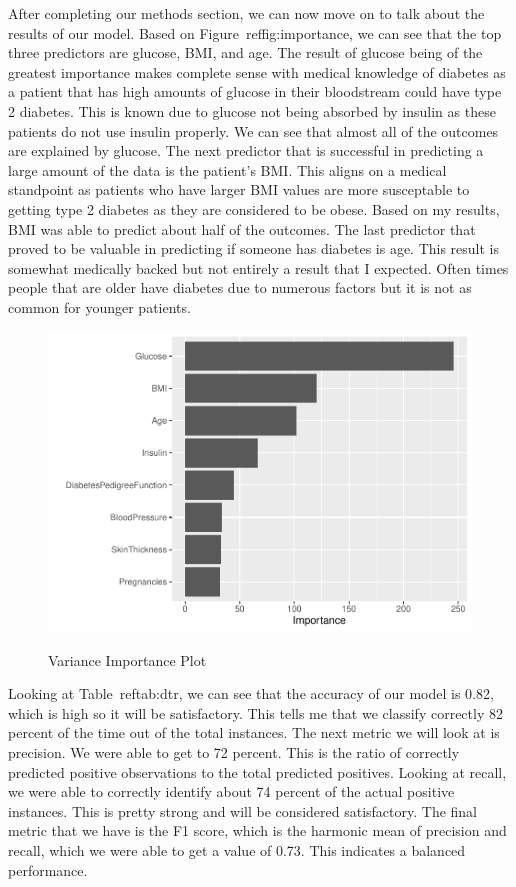 \documentclass[12pt]{article}
\begin{document}
After completing our methods section, we can now move on to talk about the results of our model. Based on Figure~ref{fig:importance}, we can 
see that the top three predictors are glucose, BMI, and age. The result of glucose being of the greatest importance makes complete sense with 
medical knowledge of diabetes as a patient that has high amounts of glucose in their bloodstream could have type 2 diabetes. This is known due
to glucose not being absorbed by insulin as these patients do not use insulin properly. We can see that almost all of the outcomes are explained
by glucose. The next predictor that is successful in predicting a large amount of the data is the patient's BMI. This aligns on a medical standpoint
as patients who have larger BMI values are more susceptable to getting type 2 diabetes as they are considered to be obese. Based on my results, BMI
was able to predict about half of the outcomes. The last predictor that proved to be valuable in predicting if someone has diabetes is age. This result
is somewhat medically backed but not entirely a result that I expected. Often times people that are older have diabetes due to numerous factors but it is 
not as common for younger patients.

\begin{figure}[tbp]
  \centering
  \caption{Variance Importance Plot}
  \includegraphics[width=\textwidth]{Variance Important.pdf}
  \label{fig:importance}
\end{figure}

Looking at Table~ref{tab:dtr}, we can see that the accuracy of our model is 0.82, which is high so it will be satisfactory. This tells me that we 
classify correctly 82 percent of the time out of the total instances. The next metric we will look at is precision. We were able to get to 72 percent.
This is the ratio of correctly predicted positive observations to the total predicted positives. Looking at recall, we were able to correctly identify about
74 percent of the actual positive instances. This is pretty strong and will be considered satisfactory. The final metric that we have is the F1 score, which is the
harmonic mean of precision and recall, which we were able to get a value of 0.73. This indicates a balanced performance.  
\end{document}
